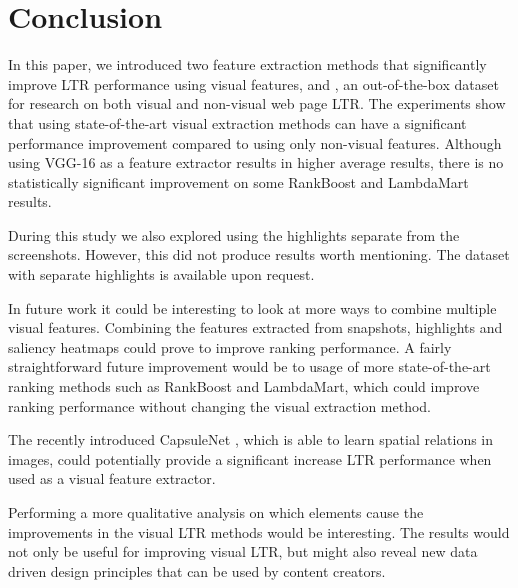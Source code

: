 
\section{Conclusion}


In this paper, we introduced two feature extraction methods that significantly improve \ac{LTR} performance using visual features, and \datasetname, an out-of-the-box dataset for research on both visual and non-visual web page \ac{LTR}.
The experiments show that using state-of-the-art visual extraction methods can have a significant performance improvement compared to using only non-visual features. Although using VGG-16 as a feature extractor results in higher average results, there is no statistically significant improvement on some RankBoost and LambdaMart results. 

 During this study we also explored using the highlights separate from the screenshots. However, this did not produce results worth mentioning. The dataset with separate highlights is available upon request. 
\fi

In future work it could be interesting to look at more ways to combine multiple visual features. Combining the features extracted from snapshots, highlights and saliency heatmaps could prove to improve ranking performance. 
A fairly straightforward future improvement would be to usage of more state-of-the-art ranking methods such as RankBoost and LambdaMart, which could improve ranking performance without changing the visual extraction method.

The recently introduced CapsuleNet \cite{sabour2017dynamic}, which is able to learn spatial relations in images, could potentially provide a significant increase \ac{LTR} performance when used as a visual feature extractor.  

Performing a more qualitative analysis on which elements cause the improvements in the visual \ac{LTR} methods would be interesting. The results would not only be useful for improving visual \ac{LTR}, but might also reveal new data driven design principles that can be used by content creators. 